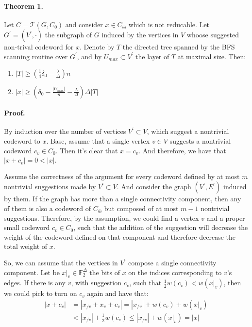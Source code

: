 \documentclass{article}
\newcommand{ \Tann } {  \mathcal{T}\left( G, C_0 \right) }
\begin{document}
\begin{multicols*}{2}
  \paragraph{Theorem 1.} Let $C = \Tann$ and consider $x \in C_{\oplus}$ which is not reducable. Let $G^{\prime} = \left( V^\prime, \cdot  \right)$ the subgraph of $G$ induced by the vertices in $V$ whoose suggested non-trival codeword for $x$. Denote by $T$ the directed tree spanned by the BFS scanning routine over $G^{\prime}$, and by $U_{max} \subset V^{\prime} $ the layer of $T$ at maximal size. Then:
  \begin{enumerate}
    \item $ |T|  \ge \left( \frac{1}{4}\delta_{0} - \frac{\lambda}{\Delta} \right)n $
    \item $ |x| \ge \left( \delta_{0} - \frac{|U_{\max}|}{n} - \frac{\lambda}{\Delta} \right) \Delta|T| $
  \end{enumerate}
  \paragraph{Proof.} By induction over the number of vertices $V^\prime \subset V$, which suggest a nontrivial codeword to $x$. Base, assume that a single vertex $v \in V$ suggests a nontrivial codeword $c_{v} \in C_{0}$. Then it's clear that $x = c_{v}$. And therefore, we have that $|x +c_{v}| = 0 < |x|$.

  Assume the correctness of the argument for every codeword defined by at most $m$ nontrivial suggestions made by $V^\prime \subset V$. And consider the graph $\left( V^\prime, E^\prime \right)$ induced by them. If the graph has more than a single connectivity component, then any of them is also a codeword of $C_{\oplus}$  but composed of at most $m-1$ nontrivial suggestions. Therefore, by the assumption, we could find a vertex $v$ and a proper small codeword $c_v \in C_0 $, such that the addition of the suggestion will decrease the weight of the codeword defined on that component and therefore decrease the total weight of $x$.

  So, we can assume that the vertices in $V^\prime$ compose a single connectivity component. Let be $x|_{v} \in \mathbb{F}_{2}^{\Delta}$ the bits of $x$ on the indices corresponding to $v$'s edges. If there is any $v$, with suggestion $c_{v}$, such that $ \frac{1}{2}w\left( c_{v}\right) < w\left( x|_{v} \right)$, then we could pick to turn on $c_{v}$ again and have that:
  \begin{equation*}
    \begin{split}
      |x+c_{v}| & = | x_{/v} + x_{v} + c_{v}| = |x_{/v}| + w\left( c_{v} \right) + w\left( x|_{v} \right) \\
      & < |x_{/v}| + \frac{1}{2}w\left( c_{v} \right) \le |x_{/v}| + w\left( x|_{v} \right) = |x|
    \end{split}
  \end{equation*}


\end{multicols*}
\end{document}
